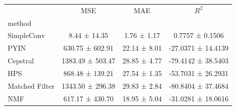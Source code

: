 \begin{tabular}{lccc}
\toprule
 & MSE & MAE & $R^2$ \\
method &  &  &  \\
\midrule
SimpleConv & 8.44 ± 14.35 & 1.76 ± 1.17 & 0.7757 ± 0.1506 \\
PYIN & 630.75 ± 602.91 & 22.14 ± 8.01 & -27.0371 ± 14.4139 \\
Cepstral & 1383.49 ± 503.47 & 28.85 ± 4.77 & -79.4142 ± 38.5403 \\
HPS & 868.48 ± 139.21 & 27.54 ± 1.35 & -53.7031 ± 26.2931 \\
Matched Filter & 1343.50 ± 296.38 & 29.83 ± 2.84 & -80.8404 ± 37.4684 \\
NMF & 617.17 ± 430.70 & 18.95 ± 5.04 & -31.0281 ± 18.0616 \\
\bottomrule
\end{tabular}
